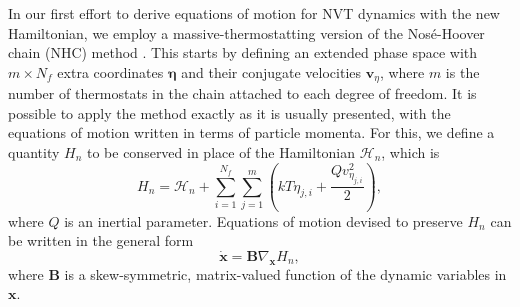 \documentclass[
aip,
jcp,
reprint,
]{revtex4-1}
\newcommand{\mt}[1]{\boldsymbol{\mathbf{#1}}}          %
\newcommand{\vt}[1]{\boldsymbol{\mathbf{#1}}}          %
\newcommand{\tr}[1]{#1^\text{t}}                       %
\newcommand{\diff}[2]{\frac{\partial #2}{\partial #1}} %
\begin{document}
In our first effort to derive equations of motion for NVT dynamics with the new Hamiltonian, we employ a massive-thermostatting version of the Nos\'{e}-Hoover chain (NHC) method \cite{Martyna_1992}.
This starts by defining an extended phase space with $m \times N_f$ extra coordinates $\vt \eta$ and their conjugate velocities $\vt v_\eta$, where $m$ is the number of thermostats in the chain attached to each degree of freedom.
It is possible to apply the method exactly as it is usually presented, with the equations of motion written in terms of particle momenta.
For this, we define a quantity $H_n$ to be conserved in place of the Hamiltonian $\mathcal{H}_n$, which is
\begin{equation*}
H_n = {\mathcal H}_n + \sum_{i=1}^{N_f} \sum_{j=1}^m \left(k T \eta_{j, i} + \frac{Q v_{\eta_{j, i}}^2}{2} \right),
\end{equation*}
where $Q$ is an inertial parameter.
Equations of motion devised to preserve $H_n$ can be written in the general form \cite{Sergi_2001}
\begin{equation*}
\dot{\vt x} = {\mt B} \nabla_{\vt x}{H_n},
\end{equation*}
where $\mt B$ is a skew-symmetric, matrix-valued function of the dynamic variables in $\vt x$.
\end{document}

